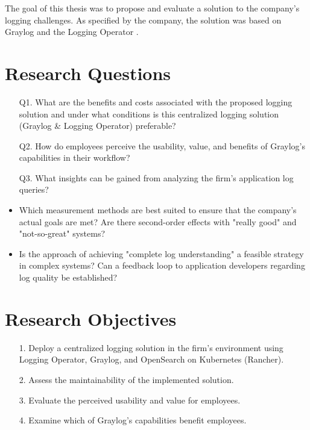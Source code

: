 \documentclass[../main.tex]{subfiles}
\begin{document}
The goal of this thesis was to propose and evaluate a solution to the company's logging challenges. As specified by the company, the solution was based on Graylog \cite{graylog} and the Logging Operator \cite{logoperator}.

\section{Research Questions}

\begin{itemize}

\item[Q1.] What are the benefits and costs associated with the proposed logging solution and under what conditions is this centralized logging solution (Graylog \& Logging Operator) preferable?

\item[Q2.] How do employees perceive the usability, value, and benefits of Graylog's capabilities in their workflow?
\item[Q3.] What insights can be gained from analyzing the firm's application log queries?

\item Which measurement methods are best suited to ensure that the company's actual goals are met?
Are there second-order effects with "really good" and "not-so-great" systems?

\item Is the approach of achieving "complete log understanding" a feasible strategy in complex systems?
Can a feedback loop to application developers regarding log quality be established?

\end{itemize}

\section{Research Objectives}

\begin{itemize}
\item[1.] Deploy a centralized logging solution in the firm's environment using Logging Operator, Graylog, and OpenSearch on Kubernetes (Rancher).
\item[2.] Assess the maintainability of the implemented solution.
\item[3.] Evaluate the perceived usability and value for employees. 
\item[4.] Examine which of Graylog's capabilities benefit employees.
\end{itemize}
\end{document}
